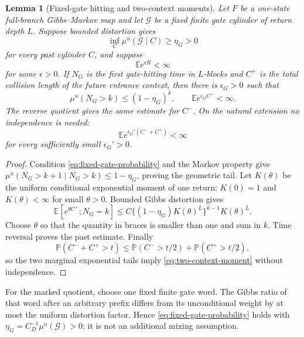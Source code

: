 \documentclass[11pt]{article}
\newtheorem{lemma}[theorem]{Lemma}
\begin{document}
\begin{lemma}[Fixed-gate hitting and two-context moments]
\label{lem:fixed-gate-context-moment}
Let $F$ be a one-state full-branch Gibbs--Markov map and let $\mathcal G$ be a
fixed finite gate cylinder of return depth $L$.  Suppose bounded distortion
gives
\begin{equation}
\label{eq:fixed-gate-probability}
 \inf_C\mu^u(\mathcal G\mid C)\ge\eta_G>0
\end{equation}
for every past cylinder $C$, and suppose
\begin{equation}
\label{eq:return-exponential-moment}
 \mathbb E e^{\epsilon R}<\infty
\end{equation}
for some $\epsilon>0$.  If $N_G$
is the first gate-hitting time in $L$-blocks and $C^+$ is the total collision
length of the future entrance context, then there is $\epsilon_G>0$ such that
\[
 \mu^u(N_G>k)\le(1-\eta_G)^k,
 \qquad
 \mathbb E e^{\epsilon_G C^+}<\infty.
\]
The reverse quotient gives the same estimate for $C^-$.  On the natural
extension no independence is needed:
\begin{equation}
\label{eq:two-context-moment}
 \mathbb E e^{\epsilon_G'(C^-+C^+)}<\infty
\end{equation}
for every sufficiently small $\epsilon_G'>0$.
\end{lemma}

\begin{proof}
Condition \eqref{eq:fixed-gate-probability} and the Markov property give
$\mu^u(N_G>k+1\mid N_G>k)\le1-\eta_G$, proving the geometric tail.  Let
$K(\theta)$ be the uniform conditional exponential moment of one return;
$K(0)=1$ and $K(\theta)<\infty$ for small $\theta>0$.  Bounded Gibbs
distortion gives
\[
 \mathbb E\!\left[e^{\theta C^+};N_G=k\right]
 \le C\{(1-\eta_G)K(\theta)^L\}^{k-1}K(\theta)^L.
\]
Choose $\theta$ so that the quantity in braces is smaller than one and sum in
$k$.  Time reversal proves the past estimate.  Finally
\[
 \mathbb P(C^-+C^+>t)
 \le\mathbb P(C^->t/2)+\mathbb P(C^+>t/2),
\]
so the two marginal exponential tails imply
\eqref{eq:two-context-moment} without independence.
\end{proof}

For the marked quotient, choose one fixed finite gate word.  The Gibbs ratio
of that word after an arbitrary prefix differs from its unconditional weight
by at most the uniform distortion factor.  Hence
\eqref{eq:fixed-gate-probability} holds with
$\eta_G=C_D^{-1}\mu^u(\mathcal G)>0$; it is not an additional mixing
assumption.
\end{document}
